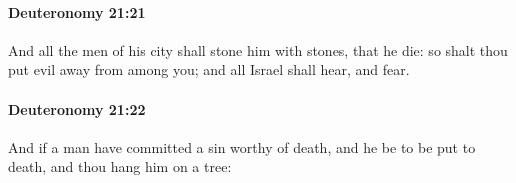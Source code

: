 		\paragraph{Deuteronomy 21:21} %
			\label{DEUTERONOMY-21-21}

			And all the men of his city shall stone him with stones, that he die: so shalt thou put evil away from among you; and all Israel shall hear, and fear.


		\paragraph{Deuteronomy 21:22} %
			\label{DEUTERONOMY-21-22}

			And if a man have committed a sin worthy of death, and he be to be put to death, and thou hang him on a tree:


